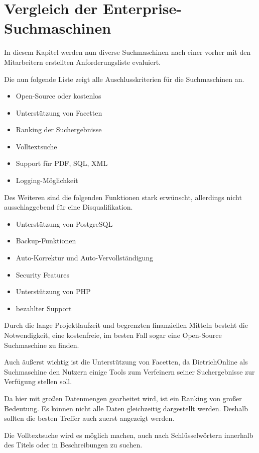 \chapter{Vergleich der Enterprise-Suchmaschinen}

In diesem Kapitel werden nun diverse Suchmaschinen nach einer vorher mit den Mitarbeitern erstellten Anforderungsliste evaluiert.

Die nun folgende Liste zeigt alle Auschlusskriterien für die Suchmaschinen an.
\begin{itemize}
    \item Open-Source oder kostenlos
    \item Unterstützung von Facetten
    \item Ranking der Suchergebnisse
    \item Volltextsuche
    \item Support für PDF, SQL, XML
    \item Logging-Möglichkeit
\end{itemize}

Des Weiteren sind die folgenden Funktionen stark erwünscht, allerdings nicht ausschlaggebend für eine Disqualifikation.

\begin{itemize}
    \item Unterstützung von PostgreSQL
    \item Backup-Funktionen
    \item Auto-Korrektur und Auto-Vervollständigung
    \item Security Features
    \item Unterstützung von PHP
    \item bezahlter Support
\end{itemize}

Durch die lange Projektlaufzeit und begrenzten finanziellen Mitteln besteht die Notwendigkeit, eine kostenfreie, im besten Fall sogar eine Open-Source Suchmaschine zu finden. 

Auch äußerst wichtig ist die Unterstützung von Facetten, da DietrichOnline als Suchmaschine den Nutzern einige Tools zum Verfeinern seiner Suchergebnisse zur Verfügung stellen soll.

Da hier mit großen Datenmengen gearbeitet wird, ist ein Ranking von großer Bedeutung. Es können nicht alle Daten gleichzeitig dargestellt werden. Deshalb sollten die besten Treffer auch zuerst angezeigt werden.

Die Volltextsuche wird es möglich machen, auch nach Schlüsselwörtern innerhalb des Titels oder in Beschreibungen zu suchen.

